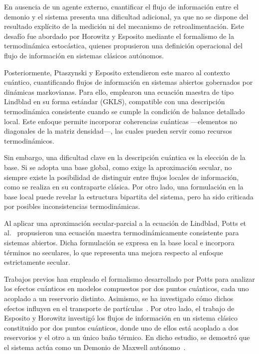 En ausencia de un agente externo, cuantificar el flujo de información entre el demonio y el sistema presenta una dificultad adicional, ya que no se dispone del resultado explícito de la medición ni del mecanismo de retroalimentación. Este desafío fue abordado por Horowitz y Esposito mediante el formalismo de la termodinámica estocástica\cite{horowitz2014thermodynamics}, quienes propusieron una definición operacional del flujo de información en sistemas clásicos autónomos.

Posteriormente, Ptaszynski y Esposito extendieron este marco al contexto cuántico, cuantificando flujos de información en sistemas abiertos gobernados por dinámicas markovianas\cite{ptaszynski2019thermodynamics}. Para ello, emplearon una ecuación maestra de tipo Lindblad en su forma estándar (GKLS)\cite{gorini1976completely,lindblad1976generators,breuer2002theory}, compatible con una descripción termodinámica consistente cuando se cumple la condición de balance detallado local. Este enfoque permite incorporar coherencias cuánticas —elementos no diagonales de la matriz densidad—, las cuales pueden servir como recursos termodinámicos\cite{ptaszynski2023fermionic,streltsov2017colloquium}.

Sin embargo, una dificultad clave en la descripción cuántica es la elección de la base. Si se adopta una base global, como exige la aproximación secular, no siempre existe la posibilidad de distinguir entre flujos locales de información, como se realiza en su contraparte clásica\cite{horowitz2014thermodynamics}. Por otro lado, una formulación en la base local puede revelar la estructura bipartita del sistema, pero ha sido criticada por posibles inconsistencias termodinámicas\cite{levy2014local,novotny2002investigation}.

Al aplicar una aproximación secular-parcial a la ecuación de Lindblad, Potts et al.\ \cite{potts2021thermodynamically} propusieron una ecuación maestra termodinámicamente consistente para sistemas abiertos. 
Dicha formulación se expresa en la base local e incorpora términos no seculares, lo que representa una mejora respecto al enfoque estrictamente secular.

Trabajos previos han empleado el formalismo desarrollado por Potts para analizar los efectos cuánticos en modelos compuestos por dos puntos cuánticos, cada uno acoplado a un reservorio distinto. Asimismo, se ha investigado cómo dichos efectos influyen en el transporte de partículas~\cite{prech2023entanglement}. Por otro lado, el trabajo de Esposito y Horowitz investigó los flujos de información en un sistema clásico constituido por dos puntos cuánticos, donde uno de ellos está acoplado a dos reservorios y el otro a un único baño térmico. En dicho estudio, se demostró que el sistema actúa como un Demonio de Maxwell autónomo~\cite{horowitz2014thermodynamics}.

